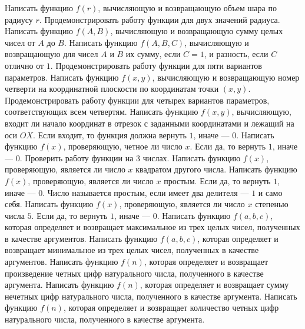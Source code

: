 Написать функцию $f(r)$, вычисляющую и возвращающую объем шара по радиусу $r$. Продемонстрировать работу функции для двух значений радиуса.
Написать функцию $f(A, B)$, вычисляющую и возвращающую сумму целых чисел от $A$ до $B$.
Написать функцию $f(A, B, C)$, вычисляющую и возвращающую для чисел $A$ и $B$ их сумму, если $C = 1$, и разность, если $C$ отлично от $1$. Продемонстрировать работу функции для пяти вариантов параметров.
Написать функцию $f(x, y)$, вычисляющую и возвращающую номер четверти на координатной плоскости по координатам точки $(x, y)$. Продемонстрировать работу функции для четырех вариантов параметров, соответствующих всем четвертям.
Написать функцию $f(x, y)$, вычисляющую, входит ли начало координат в отрезок с заданными координатами и лежащий на оси $OX$. Если входит, то функция должна вернуть $1$, иначе --- $0$.
Написать функцию $f(x)$, проверяющую, четное ли число $x$. Если да, то вернуть $1$, иначе --- $0$. Проверить работу функции на $3$ числах.
Написать функцию $f(x)$, проверяющую, является ли число $x$ квадратом другого числа.
Написать функцию $f(x)$, проверяющую, является ли число $x$ простым. Если да, то вернуть $1$, иначе --- $0$. Число называется простым, если имеет два делителя --- $1$ и само себя.
Написать функцию $f(x)$, проверяющую, является ли число $x$ степенью числа $5$. Если да, то вернуть $1$, иначе --- $0$.
Написать функцию $f(a, b, c)$, которая определяет и возвращает максимальное из трех целых чисел, полученных в качестве аргументов.
Написать функцию $f(a, b, c)$, которая определяет и возвращает минимальное из трех целых чисел, полученных в качестве аргументов.
Написать функцию $f(n)$, которая определяет и возвращает произведение четных цифр натурального числа, полученного в качестве аргумента.
Написать функцию $f(n)$, которая определяет и возвращает сумму нечетных цифр натурального числа, полученного в качестве аргумента.
Написать функцию $f(n)$, которая определяет и возвращает количество четных цифр натурального числа, полученного в качестве аргумента.
